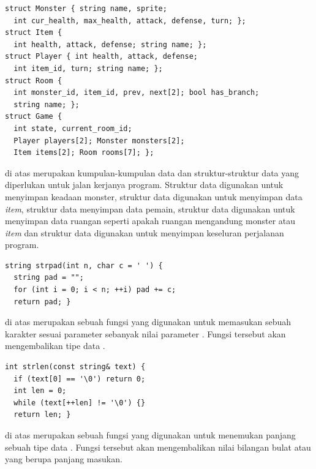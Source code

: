 \documentclass[../main.tex]{subfiles}
\begin{document}
\begin{code}
\begin{verbatim}
struct Monster { string name, sprite;
  int cur_health, max_health, attack, defense, turn; };
struct Item {
  int health, attack, defense; string name; };
struct Player { int health, attack, defense;
  int item_id, turn; string name; };
struct Room {
  int monster_id, item_id, prev, next[2]; bool has_branch;
  string name; };
struct Game {
  int state, current_room_id;
  Player players[2]; Monster monsters[2];
  Item items[2]; Room rooms[7]; };
\end{verbatim}
\end{code}

{\Script} di atas merupakan kumpulan-kumpulan data dan struktur-struktur data yang diperlukan untuk jalan kerjanya program. Struktur data  digunakan untuk menyimpan keadaan monster, struktur data  digunakan untuk menyimpan data \textit{item}, struktur data  menyimpan data pemain, struktur data  digunakan untuk menyimpan data ruangan seperti apakah ruangan mengandung monster atau \textit{item} dan struktur data  digunakan untuk menyimpan keseluran perjalanan program.

\begin{code}
\begin{verbatim}
string strpad(int n, char c = ' ') {
  string pad = "";
  for (int i = 0; i < n; ++i) pad += c;
  return pad; }
\end{verbatim}
\end{code}

{\Script} di atas merupakan sebuah fungsi yang digunakan untuk memasukan sebuah karakter sesuai parameter  sebanyak nilai parameter . Fungsi tersebut akan mengembalikan tipe data .

\begin{code}
\begin{verbatim}
int strlen(const string& text) {
  if (text[0] == '\0') return 0;
  int len = 0;
  while (text[++len] != '\0') {}
  return len; }
\end{verbatim}
\end{code}

{\Script} di atas merupakan sebuah fungsi yang digunakan untuk menemukan panjang sebuah tipe data . Fungsi tersebut akan mengembalikan nilai bilangan bulat atau  yang berupa panjang  masukan.
\end{document}
